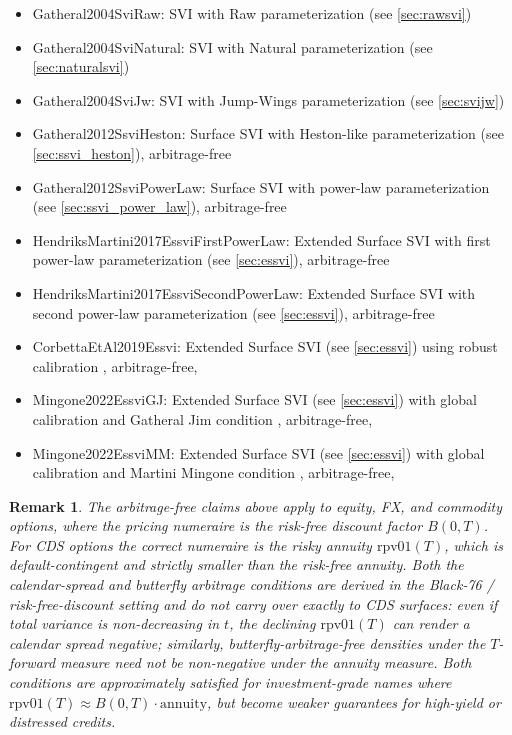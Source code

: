 \documentclass{amsart}
\theoremstyle{plain}
\newtheorem{remark}{Remark}
\numberwithin{equation}{section}
\begin{document}
\begin{itemize}
\item Gatheral2004SviRaw: SVI with Raw parameterization (see \ref{sec:rawsvi})
\item Gatheral2004SviNatural: SVI with Natural parameterization (see \ref{sec:naturalsvi})
\item Gatheral2004SviJw: SVI with Jump-Wings parameterization (see \ref{sec:svijw})
\item Gatheral2012SsviHeston: Surface SVI with Heston-like parameterization (see \ref{sec:ssvi_heston}), arbitrage-free
\item Gatheral2012SsviPowerLaw: Surface SVI with power-law parameterization (see \ref{sec:ssvi_power_law}), arbitrage-free
\item HendriksMartini2017EssviFirstPowerLaw: Extended Surface SVI with first power-law parameterization (see \ref{sec:essvi}), arbitrage-free
\item HendriksMartini2017EssviSecondPowerLaw: Extended Surface SVI with second power-law parameterization (see \ref{sec:essvi}), arbitrage-free
\item CorbettaEtAl2019Essvi: Extended Surface SVI (see \ref{sec:essvi}) using robust calibration \cite{Corbetta_2019}, arbitrage-free,
\item Mingone2022EssviGJ: Extended Surface SVI (see \ref{sec:essvi}) with global calibration and Gatheral Jim condition \cite{Mingone_2022}, arbitrage-free,
\item Mingone2022EssviMM: Extended Surface SVI (see \ref{sec:essvi}) with global calibration and Martini Mingone condition \cite{Mingone_2022}, arbitrage-free,
\end{itemize}

\begin{remark}
The arbitrage-free claims above apply to equity, FX, and commodity options, where the pricing numeraire is the
risk-free discount factor $B(0,T)$.  For CDS options the correct numeraire is the risky annuity $\text{rpv01}(T)$,
which is default-contingent and strictly smaller than the risk-free annuity.  Both the calendar-spread and butterfly
arbitrage conditions are derived in the Black-76 / risk-free-discount setting and do not carry over exactly to CDS
surfaces: even if total variance is non-decreasing in $t$, the declining $\text{rpv01}(T)$ can render a calendar spread
negative; similarly, butterfly-arbitrage-free densities under the $T$-forward measure need not be non-negative under the
annuity measure.  Both conditions are approximately satisfied for investment-grade names where
$\text{rpv01}(T) \approx B(0,T) \cdot \text{annuity}$, but become weaker guarantees for high-yield or distressed
credits.
\end{remark}
\end{document}
